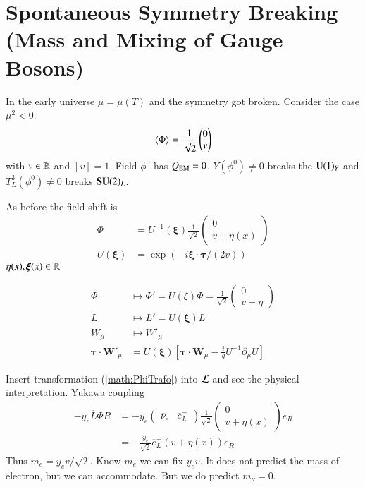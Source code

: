 \section{Spontaneous Symmetry Breaking (Mass and Mixing of Gauge Bosons)}
In the early universe $\mu = \mu(T)$ and the symmetry got broken. Consider the case $\mu^2 < 0$.
\begin{align}
   \expval{\Phi} = \frac{1}{\sqrt{2}} \begin{pmatrix} 0 \\ v \end{pmatrix}
\end{align}
with $v \in \mathbb{R}$ and $[v] = 1$. Field $\phi^0$ has $Q_{\text{EM}} = 0$. $Y(\phi^0) \neq 0$ breaks the $\mathbf{U}(1)_Y$ and $T_L^3(\phi^0) \neq 0$ breaks $\mathbf{SU}(2)_L$.

As before the field shift is 
\begin{align*}
   \Phi &= U^{-1}(\pmb\xi) \frac{1}{\sqrt{2}} \begin{pmatrix} 0 \\ v+\eta(x) \end{pmatrix} \\
   U(\pmb\xi) &= \exp(-i \pmb\xi \cdot \pmb\tau / (2v))
\end{align*}
$\eta(x), \pmb{\xi}(x) \in \mathbb{R}$

\begin{align}
   \Phi &\mapsto \Phi' = U(\xi) \Phi = \frac{1}{\sqrt{2}} \begin{pmatrix} 0 \\ v + \eta \end{pmatrix} \label{math:PhiTrafo}\\ 
   L &\mapsto L' = U(\pmb\xi) L \\
   W_\mu &\mapsto W'_\mu \\
   \pmb\tau \cdot \pmb W'_\mu &= U(\pmb\xi) \left[ \pmb \tau \cdot \pmb{W}_\mu - \frac{i}{g} U^{-1}\partial_\mu U \right]
\end{align}

Insert transformation (\ref{math:PhiTrafo}) into $\mathcal{L}$ and see the physical interpretation. Yukawa coupling
\begin{align*}
   - y_e \overline{L} \Phi R &= - y_e \begin{pmatrix} \overline{\nu}_e & \overline{e}_L^- \end{pmatrix} \frac{1}{\sqrt{2}} \begin{pmatrix} 0 \\ v + \eta(x)\end{pmatrix} e_R \\
   &= - \frac{y_e}{\sqrt{2}} \overline{e}_L^- (v+\eta(x)) e_R
\end{align*}
Thus $m_e = y_e v / \sqrt{2}$. Know $m_e$ we can fix $y_e v$. It does not predict the mass of electron, but we can accommodate. But we do predict $m_\nu = 0$.

